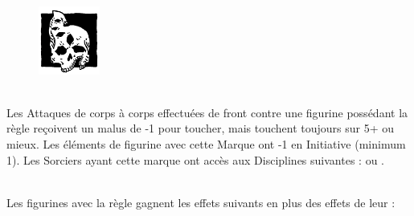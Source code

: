 \vspace{0.5cm}

\begin{figure}
\centering
\includegraphics[width=2cm]{pics/WDG4.png}
\end{figure}
\textbf{{\LARGE \MarkofPestilence{}}}\\
Les Attaques de corps à corps effectuées de front contre une figurine possédant la règle {} {reçoivent un malus de -1 pour toucher,} {mais touchent toujours sur 5+ ou mieux.} {Les éléments de figurine avec cette Marque ont} {-1 en Initiative (minimum 1).} Les Sorciers ayant cette marque ont accès aux Disciplines suivantes : \disease{} ou \death.


\armyspecialruleentry{\chosenbythegods{}}\\
Les figurines avec la règle \chosenbythegods{} gagnent les effets suivants {en plus des effets de leur \markofthedarkgods{}} :\\


